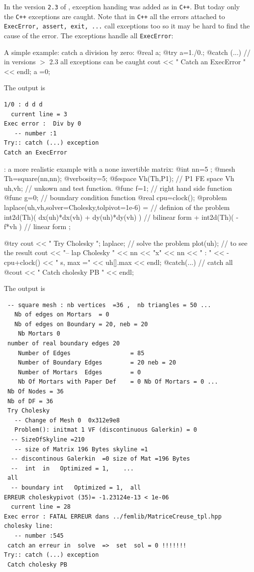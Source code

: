 \documentclass[a4paper,twoside,12pt]{book}
\def\n{\nabla}
\begin{document}
In the version \texttt{2.3} of \freefempp, exception handing was added as in \texttt{C++}.
But today only the \texttt{C++} exceptions are caught. Note that  in \texttt{C++} all the errors attached to
\texttt{ExecError, assert, exit, ...} call exceptions  too so it may be hard to find the cause of the error.
The exceptions handle all \texttt{ExecError}:



\begin{example} A simple example:    catch a  division by zero:
\bFF
@real a;
@try {
  a=1./0.;
}
@catch  (...) // in versions $>$ 2.3 all exceptions can be caught
{
  cout << " Catch an ExecError " << endl;
  a =0;
}
\eFF
\end{example}

The output is
{\small
\begin{verbatim}
1/0 : d d d
  current line = 3
Exec error :  Div by 0
   -- number :1
Try:: catch (...) exception
Catch an ExecError
\end{verbatim}
}

\begin{example}: a more realistic example with a none invertible matrix:
\bFF
@int nn=5        ;
@mesh Th=square(nn,nn);
@verbosity=5;
@fespace Vh(Th,P1);     // P1 FE space
Vh uh,vh;              // unkown and test function.
@func f=1;                 //  right hand side function
@func g=0;                 //  boundary condition function
@real   cpu=clock();
@problem laplace(uh,vh,solver=Cholesky,tolpivot=1e-6) =                    //  definion of  the problem
            int2d(Th)( dx(uh)*dx(vh) + dy(uh)*dy(vh) ) //  bilinear form
          + int2d(Th)( -f*vh )                          //  linear form
  ;

@try {
  cout << " Try Cholesky \n";
  laplace; // solve the problem 
  plot(uh); // to see the result
  cout << "-- lap Cholesky " << nn << "x" << nn << "  : " <<  -cpu+clock()
       << " s,  max =" << uh[].max << endl;
}
@catch(...) { // catch all
  @cout << " Catch cholesky PB " << endl;
}
\eFF
\end{example}
The output is
{\small
\begin{verbatim}
 -- square mesh : nb vertices  =36 ,  nb triangles = 50 ...
   Nb of edges on Mortars  = 0
   Nb of edges on Boundary = 20, neb = 20
    Nb Mortars 0
 number of real boundary edges 20
    Number of Edges                 = 85
    Number of Boundary Edges        = 20 neb = 20
    Number of Mortars  Edges        = 0
    Nb Of Mortars with Paper Def    = 0 Nb Of Mortars = 0 ...
 Nb Of Nodes = 36
 Nb of DF = 36
 Try Cholesky
   -- Change of Mesh 0  0x312e9e8
   Problem(): initmat 1 VF (discontinuous Galerkin) = 0
  -- SizeOfSkyline =210
   -- size of Matrix 196 Bytes skyline =1
  -- discontinous Galerkin  =0 size of Mat =196 Bytes
  --  int  in   Optimized = 1,    ...
 all
  -- boundary int   Optimized = 1,  all
ERREUR choleskypivot (35)= -1.23124e-13 < 1e-06
  current line = 28
Exec error : FATAL ERREUR dans ../femlib/MatriceCreuse_tpl.hpp
cholesky line:
   -- number :545
 catch an erreur in  solve  =>  set  sol = 0 !!!!!!!
Try:: catch (...) exception
 Catch cholesky PB
\end{verbatim}
}
\end{document}
